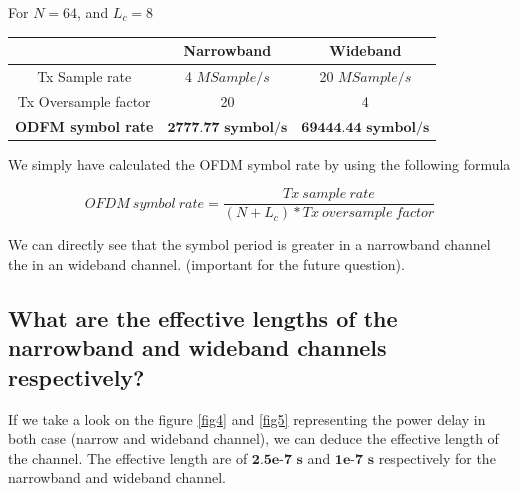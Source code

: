 \documentclass[frenchb, oneside, headings=normal]{scrartcl}
\begin{document}
For $N=64$, and $L_c=8$

\begin{center}
	\begin{tabular}{c|c|c}
		  & Narrowband & Wideband\\
		  \hline
	Tx Sample rate & 4 $MSample/s$ & 20 $MSample/s$ \\	  
	Tx Oversample factor & 20 & 4\\
	\textbf{ODFM symbol rate} &  $\textbf{2777.77 symbol/s}$ & $\textbf{69444.44 symbol/s}$ \\ 
	\end{tabular}
	\label{tab1}
\end{center}

We simply have calculated the OFDM symbol rate by using the following formula

\begin{equation}
OFDM~symbol~rate = \frac{Tx~sample~rate}{(N+L_c)*Tx~oversample~factor}
\end{equation}

We can directly see that the symbol period is greater in a narrowband channel the in an wideband channel. (important for the future question). 

\subsection{What are the effective lengths of the narrowband and wideband channels respectively?}

If we take a look on the figure \ref{fig4} and \ref{fig5} representing the power delay in both case (narrow and wideband channel), we can deduce the effective length of the channel. The effective length are of $\textbf{2.5e-7~s}$ and $\textbf{1e-7~s}$ respectively for the narrowband and wideband channel.
\end{document}
